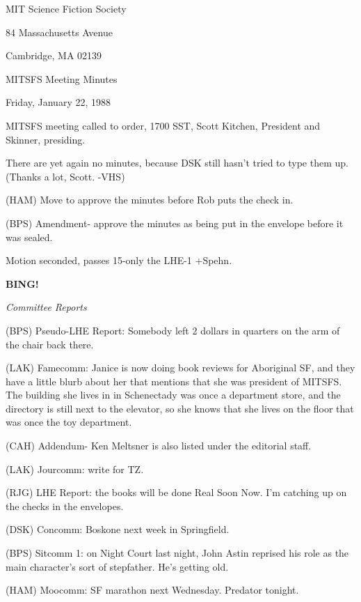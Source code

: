 \documentclass[12pt]{article}
\newcommand{\bing}{{\bf BING!} }
\newcommand{\goto}[1]{\bing \vskip 12pt \centerline{{\em{#1}}}}
\begin{document}
\begin{center}

MIT Science Fiction Society 

84 Massachusetts Avenue

Cambridge, MA 02139

\vspace{12pt}

MITSFS Meeting Minutes 

Friday, January 22, 1988

\end{center}
 
\vspace{18pt}

\setlength{\parskip}{6pt}

\noindent
MITSFS meeting called to order, 1700 SST,
Scott Kitchen, President and Skinner, presiding.

There are yet again no minutes, because DSK still hasn't tried to type them up. (Thanks a lot, Scott. -VHS)

(HAM) Move to approve the minutes before Rob puts the check in.

(BPS) Amendment- approve the minutes as being put in the envelope before it was sealed.

Motion seconded, passes 15-only the LHE-1 +Spehn.

\goto{Committee Reports}

(BPS) Pseudo-LHE Report: Somebody left 2 dollars in quarters on the arm of the chair back there.

(LAK) Famecomm: Janice is now doing book reviews for Aboriginal SF, and they have a little blurb about her that mentions that she was president of MITSFS. The building she lives in in Schenectady was once a department store, and the directory is still next to the elevator, so she knows that she lives on the floor that was once the toy department.

(CAH) Addendum- Ken Meltsner is also listed under the editorial staff.

(LAK) Jourcomm: write for TZ.

(RJG) LHE Report: the books will be done Real Soon Now. I'm catching up on the checks in the envelopes.

(DSK) Concomm: Boskone next week in Springfield.

(BPS) Sitcomm 1: on Night Court last night, John Astin reprised his role as the main character's sort of stepfather. He's getting old.

(HAM) Moocomm: SF marathon next Wednesday. Predator tonight.
\end{document}
